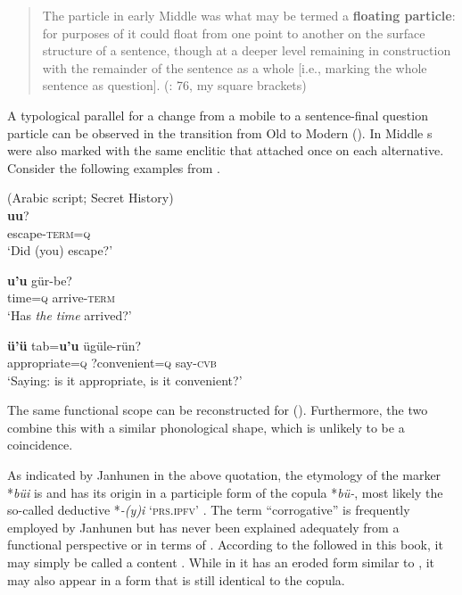 \begin{quote}
The  particle in early Middle  was what may be termed a \textbf{floating particle}: for purposes of  it could float from one point to another on the surface structure of a sentence, though at a deeper level remaining in construction with the remainder of the sentence as a whole [i.e., marking the whole sentence as question]. (\citealt{Street2008}: 76, my square brackets)
\end{quote}

\noindent A typological parallel for a change from a mobile to a sentence-final question particle can be observed in the transition from Old to Modern  (). In Middle  s were also marked with the same enclitic that attached once on each alternative. Consider the following examples from .

\ea%
    \label{ex:mong:6}
     (Arabic script; Secret History)\\
    \ea
    \textbf{{uu}}?\\
    escape-\textsc{term}=\textsc{q}\\
    \glt ‘Did (you) escape?’
    
    \ex
    \textbf{{u’u}} {gür-be?}\\
    time=\textsc{q}    arrive-\textsc{term}\\
    \glt ‘Has \textit{the time} arrived?’
    
    \ex
    \textbf{{ü’ü}} {tab=}\textbf{{u’u}} {ügüle-rün?}\\
    appropriate=\textsc{q}  ?convenient=\textsc{q}    say-\textsc{cvb}\\
    \glt ‘Saying: is it appropriate, is it convenient?’ \citep[79]{Rybatzki2003a}
    \z
    \z 

The same functional scope can be reconstructed for  (). Furthermore, the two  combine this with a similar phonological shape, which is unlikely to be a coincidence.

As indicated by Janhunen in the above quotation, the etymology of the marker *\textit{büi} is  and has its origin in a participle form of the copula *\textit{bü-}, most likely the so-called deductive *\textit{-(y)i} ‘\textsc{prs}.\textsc{ipfv}’ \citep[24]{Janhunen2003a}. The term “corrogative” is frequently employed by Janhunen but has never been explained adequately from a functional perspective or in terms of . According to the  followed in this book, it may simply be called a content . While in  it has an eroded form similar to , it may also appear in a form that is still identical to the copula.

